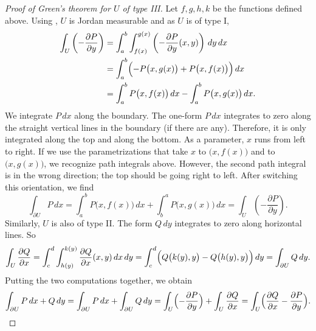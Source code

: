 \begin{proof}[Proof of Green's theorem for $U$ of type III]
Let $f,g,h,k$ be the functions defined above.
Using ,
$U$ is Jordan measurable and as $U$ is of type I\@,
\begin{equation*}
\begin{split}
\int_U 
\left(- \frac{\partial P}{\partial y} \right)
& =
\int_a^b \int_{f(x)}^{g(x)}
\left(- \frac{\partial P}{\partial y} (x,y) \right)
\, dy \, dx 
\\
& =
\int_a^b \Bigl(
- P\bigl(x,g(x)\bigr) +
P\bigl(x,f(x)\bigr)
\Bigr) \, dx
\\
& =
\int_a^b P\bigl(x,f(x)\bigr) \, dx 
-
\int_a^b P\bigl(x,g(x)\bigr) \, dx .
\end{split}
\end{equation*}
We integrate $P\,dx$ along the boundary.
The one-form $P\,dx$ integrates to zero 
along the straight vertical lines in the boundary (if there are any).
Therefore, it is only
integrated along the top and along the bottom.  As a parameter,
$x$ runs from left to right.  If we use the parametrizations that take $x$
to $\bigl(x,f(x)\bigr)$ and to
$\bigl(x,g(x)\bigr)$, we recognize path integrals above.  However, the second
path integral is in the wrong direction; the top should be going right to
left.  After switching this orientation, we find
\begin{equation*}
\int_{\partial U} P \, dx
=
\int_a^b P\bigl(x,f(x)\bigr) \, dx 
+
\int_b^a P\bigl(x,g(x)\bigr) \, dx
=
\int_U 
\left(- \frac{\partial P}{\partial y} \right) .
\end{equation*}
Similarly, $U$ is also of type II\@.  The form $Q\,dy$ integrates to zero along
horizontal lines.   So
\begin{equation*}
\int_U 
\frac{\partial Q}{\partial x}
=
\int_c^d \int_{h(y)}^{k(y)}
\frac{\partial Q}{\partial x}(x,y)
\, dx \, dy 
=
\int_c^d \Bigl(
Q\bigl(k(y),y\bigr) 
-
Q\bigl(h(y),y\bigr)
\Bigr) \, dy 
=
\int_{\partial U} Q \, dy .
\end{equation*}
Putting the two computations together, we obtain
\begin{equation*}
\int_{\partial U} P\, dx + Q \, dy 
=
\int_{\partial U} P\, dx + \int_{\partial U} Q \, dy 
=
\int_U 
\Bigl(-\frac{\partial P}{\partial y}\Bigr)
+
\int_U 
\frac{\partial Q}{\partial x}
=
\int_U 
\Bigl(
\frac{\partial Q}{\partial x}
-\frac{\partial P}{\partial y}
\Bigr) . \qedhere
\end{equation*}
\end{proof}

